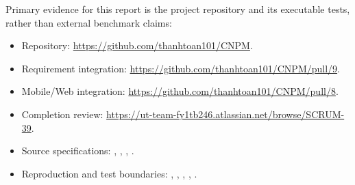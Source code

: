 Primary evidence for this report is the project repository and its executable
tests, rather than external benchmark claims:
\begin{itemize}
\item Repository: \url{https://github.com/thanhtoan101/CNPM}.
\item Requirement integration: \url{https://github.com/thanhtoan101/CNPM/pull/9}.
\item Mobile/Web integration: \url{https://github.com/thanhtoan101/CNPM/pull/8}.
\item Completion review: \url{https://ut-team-fy1tb246.atlassian.net/browse/SCRUM-39}.
\item Source specifications: ,
, , .
\item Reproduction and test boundaries: ,
, ,
, .
\end{itemize}

